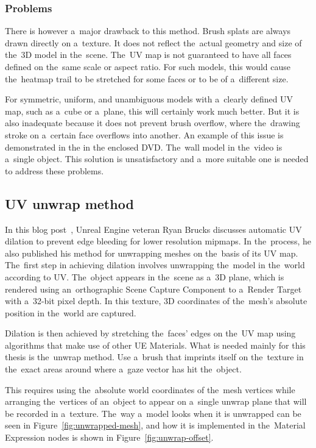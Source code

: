 \subsubsection*{Problems}
There is however a~major drawback to this method. Brush splats are always drawn directly on a~texture. It does not reflect the~actual geometry and size of the~3D model in the~scene. The~UV map is not guaranteed to have all faces defined on the~same scale or aspect ratio. For such models, this would cause the~heatmap trail to be stretched for some faces or to be of a~different size. 

For symmetric, uniform, and unambiguous models with a~clearly defined UV map, such as a~cube or a~plane, this will certainly work much better. But it is also inadequate because it does not prevent brush overflow, where the~drawing stroke on a~certain face overflows into another. An example of this issue is demonstrated in the  in the enclosed DVD. The~wall model in the~video is a~single object. This solution is unsatisfactory and a~more suitable one is needed to address these problems.

\subsection{UV unwrap method}
\label{sec:uv-unwrap-method}

In this blog post~\cite{brucks2016shaderbits}, Unreal Engine veteran Ryan Brucks discusses automatic UV dilation to prevent edge bleeding for lower resolution mipmaps. In the~process, he also published his method for unwrapping meshes on the~basis of its UV map. The~first step in achieving dilation involves unwrapping the~model in the~world according to UV. The~object appears in the~scene as a~3D plane, which is rendered using an~orthographic Scene Capture Component to a~Render Target with a~32-bit pixel depth. In this texture, 3D coordinates of the~mesh's absolute position in the~world are captured. 

Dilation is then achieved by stretching the~faces' edges on the~UV map using algorithms that make use of other UE Materials. What is needed mainly for this thesis is the~unwrap method. Use a~brush that imprints itself on the~texture in the~exact areas around where a~gaze vector has hit the~object.

This requires using the~absolute world coordinates of the~mesh vertices while arranging the~vertices of an~object to appear on a~single unwrap plane that will be recorded in a~texture. The~way a~model looks when it is unwrapped can be seen in Figure~\ref{fig:unwrapped-mesh}, and how it is implemented in the~Material Expression nodes is shown in Figure~\ref{fig:unwrap-offset}. 

